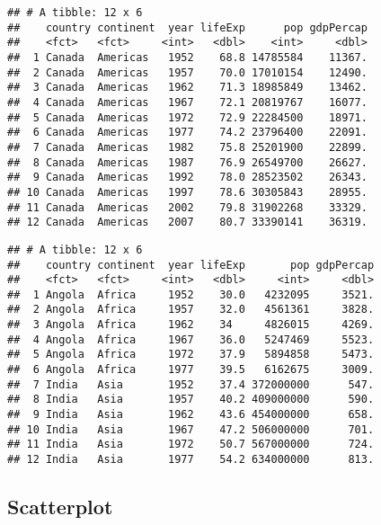 \documentclass[]{article}
\newenvironment{Shaded}{\begin{snugshade}}{\end{snugshade}}
\newcommand{\DecValTok}[1]{\textcolor[rgb]{0.00,0.00,0.81}{#1}}
\newcommand{\KeywordTok}[1]{\textcolor[rgb]{0.13,0.29,0.53}{\textbf{#1}}}
\newcommand{\NormalTok}[1]{#1}
\newcommand{\OperatorTok}[1]{\textcolor[rgb]{0.81,0.36,0.00}{\textbf{#1}}}
\newcommand{\StringTok}[1]{\textcolor[rgb]{0.31,0.60,0.02}{#1}}
\begin{document}
\begin{verbatim}
## # A tibble: 12 x 6
##    country continent  year lifeExp      pop gdpPercap
##    <fct>   <fct>     <int>   <dbl>    <int>     <dbl>
##  1 Canada  Americas   1952    68.8 14785584    11367.
##  2 Canada  Americas   1957    70.0 17010154    12490.
##  3 Canada  Americas   1962    71.3 18985849    13462.
##  4 Canada  Americas   1967    72.1 20819767    16077.
##  5 Canada  Americas   1972    72.9 22284500    18971.
##  6 Canada  Americas   1977    74.2 23796400    22091.
##  7 Canada  Americas   1982    75.8 25201900    22899.
##  8 Canada  Americas   1987    76.9 26549700    26627.
##  9 Canada  Americas   1992    78.0 28523502    26343.
## 10 Canada  Americas   1997    78.6 30305843    28955.
## 11 Canada  Americas   2002    79.8 31902268    33329.
## 12 Canada  Americas   2007    80.7 33390141    36319.
\end{verbatim}

\begin{Shaded}
\end{Shaded}

\begin{verbatim}
## # A tibble: 12 x 6
##    country continent  year lifeExp       pop gdpPercap
##    <fct>   <fct>     <int>   <dbl>     <int>     <dbl>
##  1 Angola  Africa     1952    30.0   4232095     3521.
##  2 Angola  Africa     1957    32.0   4561361     3828.
##  3 Angola  Africa     1962    34     4826015     4269.
##  4 Angola  Africa     1967    36.0   5247469     5523.
##  5 Angola  Africa     1972    37.9   5894858     5473.
##  6 Angola  Africa     1977    39.5   6162675     3009.
##  7 India   Asia       1952    37.4 372000000      547.
##  8 India   Asia       1957    40.2 409000000      590.
##  9 India   Asia       1962    43.6 454000000      658.
## 10 India   Asia       1967    47.2 506000000      701.
## 11 India   Asia       1972    50.7 567000000      724.
## 12 India   Asia       1977    54.2 634000000      813.
\end{verbatim}

\hypertarget{scatterplot}{%
\subsection{Scatterplot}\label{scatterplot}}
\end{document}
